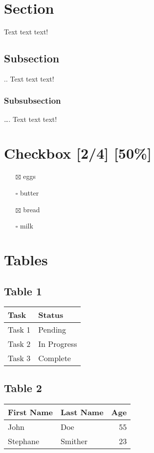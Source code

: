 \documentclass[11pt]{article}
\author{Ghassan Arnouk}
\date{\today}
\title{}
\begin{document}
\tableofcontents

\section{Section}
\label{sec:org21d6f8c}
Text text text!
\subsection{Subsection}
\label{sec:org9339925}
.. Text text text!
\subsubsection{Subsubsection}
\label{sec:org8261d77}
\ldots{}. Text text text!
\section{Checkbox [2/4] [50\%]}
\label{sec:orgd41f45e}

\begin{itemize}
\item[{$\boxtimes$}] eggs
\item[{$\square$}] butter
\item[{$\boxtimes$}] bread
\item[{$\square$}] milk
\end{itemize}
\section{Tables}
\label{sec:org0031cb7}

\subsection{Table 1}
\label{sec:orgea77760}

\begin{center}
\begin{tabular}{ll}
Task & Status\\
\hline
Task 1 & Pending\\
Task 2 & In Progress\\
Task 3 & Complete\\
\end{tabular}
\end{center}
\subsection{Table 2}
\label{sec:orge932df3}

\begin{center}
\begin{tabular}{llr}
First Name & Last Name & Age\\
\hline
John & Doe & 55\\
Stephane & Smither & 23\\
\hline
\end{tabular}
\end{center}
\end{document}
